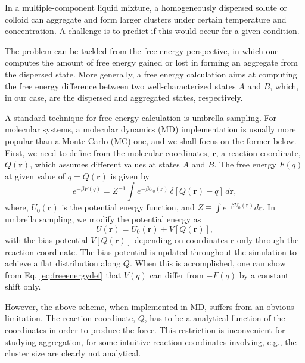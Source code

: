 \documentclass[aip,jcp,preprint,superscriptaddress]{revtex4-1}
\newcommand{\vct}[1]{\mathbf{#1}}
\newcommand{\vr}{\vct{r}}
\begin{document}
%
In a multiple-component liquid mixture,
a homogeneously dispersed solute or colloid
can aggregate and form larger clusters
under certain temperature and concentration.
%
A challenge is to predict if this would occur
for a given condition.



%
The problem can be tackled
from the free energy perspective,
%
in which one computes
the amount of free energy gained or lost
in forming an aggregate from the dispersed state.
%
More generally,
a free energy calculation
aims at computing the free energy difference
between two well-characterized states $A$ and $B$,
which, in our case,
are the dispersed and aggregated states, respectively.


%
A standard technique for free energy calculation is
umbrella sampling.
%
For molecular systems,
a molecular dynamics (MD) implementation
is usually more popular than
a Monte Carlo (MC) one,
and we shall focus on the former below.
%
First,
we need to define
from the molecular coordinates, $\vr$,
a reaction coordinate, $Q(\vr)$,
which assumes different values
at states $A$ and $B$.
%
The free energy $F(q)$
at given value of $q = Q(\vr)$
is given by
%
\begin{equation}
e^{-\beta F(q)}
=
Z^{-1}
\int
  e^{-\beta U_0(\vr)} \,
  \delta[Q(\vr) - q] \,
  d\vr,
\label{eq:freeenergydef}
\end{equation}
%
where,
$U_0(\vr)$
is the potential energy function,
and
$Z \equiv \int e^{-\beta U_0(\vr)} d\vr$.
%
In umbrella sampling,
we modify the potential energy as
%
\begin{equation}
U(\vr)
=
U_0(\vr)
+
V[Q(\vr)],
\end{equation}
%
with the bias potential
$V[Q(\vr)]$
depending on coordinates $\vr$
only through the reaction coordinate.
%
The bias potential
is updated throughout the simulation
to achieve a flat distribution along $Q$.
%
When this is accomplished,
one can show from Eq. \eqref{eq:freeenergydef}
that $V(q)$ can differ from $-F(q)$
by a constant shift only.



%
However, the above scheme, when implemented in MD,
suffers from an obvious limitation.
%
The reaction coordinate, $Q$,
has to be a analytical function of the coordinates
in order to produce the force.
%
This restriction is inconvenient
for studying aggregation,
for some intuitive reaction coordinates
involving, e.g., the cluster size
are clearly not analytical.
\end{document}
